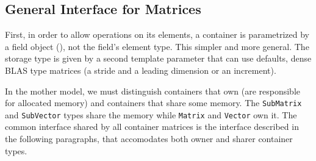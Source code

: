 \subsection{General Interface for %
Matrices}
%
First, in order to allow operations on its elements, a container is
parametrized by a field object (\cf {}), not the field's element
type. This simpler and more general.  The storage type is given by a second
template parameter that can use defaults,
\eg dense BLAS type matrices (a stride
and a leading dimension or an increment).
%

%
In the mother model, we must distinguish containers that own (are responsible
for allocated memory) and containers that share some memory.  The
\texttt{SubMatrix} and \texttt{SubVector} types share the memory while
\texttt{Matrix} and \texttt{Vector} own it.
%
The common interface shared by all container matrices is the \applin  interface
described in the following paragraphs, that accomodates both owner and sharer
container types.
%
% 
%
